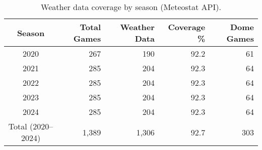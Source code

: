 \begin{table}[t]
  \centering
  \small
  \caption[Weather data coverage]{Weather data coverage by season (Meteostat API).}
  \label{tab:weather-coverage}
  \setlength{\tabcolsep}{4pt}\renewcommand{\arraystretch}{1.12}
  \begin{tabular}{@{} c r r r r @{} }
    \toprule
    \textbf{Season} & \textbf{Total Games} & \textbf{Weather Data} & \textbf{Coverage \%} & \textbf{Dome Games} \\
    \midrule
    2020 & 267 & 190 & 92.2 & 61 \\
    2021 & 285 & 204 & 92.3 & 64 \\
    2022 & 285 & 204 & 92.3 & 64 \\
    2023 & 285 & 204 & 92.3 & 64 \\
    2024 & 285 & 204 & 92.3 & 64 \\
    \midrule
    Total (2020--2024) & 1,389 & 1,306 & 92.7 & 303 \\
    \bottomrule
  \end{tabular}
\end{table}
